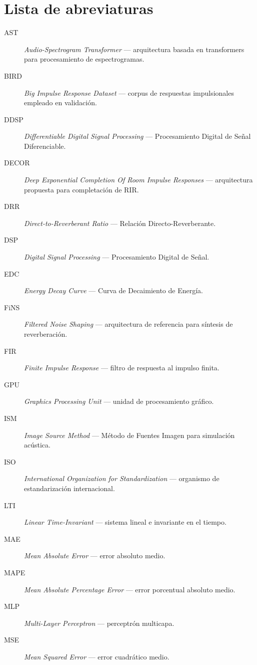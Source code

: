
\chapter*{Lista de abreviaturas}

\begin{description}
	\item[AST] \textit{Audio-Spectrogram Transformer} — arquitectura basada en transformers para procesamiento de espectrogramas.
	\item[BIRD] \textit{Big Impulse Response Dataset} — corpus de respuestas impulsionales empleado en validación.
	\item[DDSP] \textit{Differentiable Digital Signal Processing} — Procesamiento Digital de Señal Diferenciable.
	\item[DECOR] \textit{Deep Exponential Completion Of Room Impulse Responses} — arquitectura propuesta para completación de RIR.
	\item[DRR] \textit{Direct-to-Reverberant Ratio} — Relación Directo-Reverberante.
	\item[DSP] \textit{Digital Signal Processing} — Procesamiento Digital de Señal.
	\item[EDC] \textit{Energy Decay Curve} — Curva de Decaimiento de Energía.
	\item[FiNS] \textit{Filtered Noise Shaping} — arquitectura de referencia para síntesis de reverberación.
	\item[FIR] \textit{Finite Impulse Response} — filtro de respuesta al impulso finita.
	\item[GPU] \textit{Graphics Processing Unit} — unidad de procesamiento gráfico.
	\item[ISM] \textit{Image Source Method} — Método de Fuentes Imagen para simulación acústica.
	\item[ISO] \textit{International Organization for Standardization} — organismo de estandarización internacional.
	\item[LTI] \textit{Linear Time-Invariant} — sistema lineal e invariante en el tiempo.
	\item[MAE] \textit{Mean Absolute Error} — error absoluto medio.
	\item[MAPE] \textit{Mean Absolute Percentage Error} — error porcentual absoluto medio.
	\item[MLP] \textit{Multi-Layer Perceptron} — perceptrón multicapa.
	\item[MSE] \textit{Mean Squared Error} — error cuadrático medio.

\end{description}
